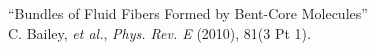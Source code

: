 ``Bundles of Fluid Fibers Formed by Bent-Core Molecules'' \\
\small{C. Bailey, \textit{et al.}, \textit{Phys. Rev. E} (2010), 81(3 Pt 1).} \\
